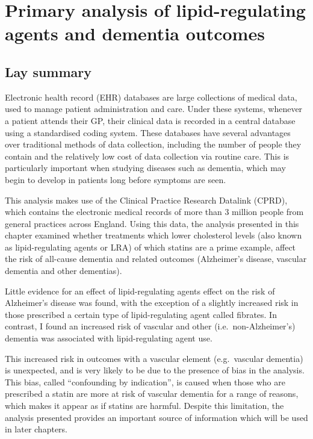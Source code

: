 \documentclass[a4paper, twoside]{templates/ociamthesis}
\begin{document}
\hypertarget{cprd-analysis-heading}{%
\chapter{Primary analysis of lipid-regulating agents and dementia outcomes}\label{cprd-analysis-heading}}

\minitoc 

\hypertarget{lay-summary-4}{%
\section{Lay summary}\label{lay-summary-4}}

Electronic health record (EHR) databases are large collections of medical data, used to manage patient administration and care. Under these systems, whenever a patient attends their GP, their clinical data is recorded in a central database using a standardised coding system. These databases have several advantages over traditional methods of data collection, including the number of people they contain and the relatively low cost of data collection via routine care. This is particularly important when studying diseases such as dementia, which may begin to develop in patients long before symptoms are seen.

This analysis makes use of the Clinical Practice Research Datalink (CPRD), which contains the electronic medical records of more than 3 million people from general practices across England. Using this data, the analysis presented in this chapter examined whether treatments which lower cholesterol levels (also known as lipid-regulating agents or LRA) of which statins are a prime example, affect the risk of all-cause dementia and related outcomes (Alzheimer's disease, vascular dementia and other dementias).

Little evidence for an effect of lipid-regulating agents effect on the risk of Alzheimer's disease was found, with the exception of a slightly increased risk in those prescribed a certain type of lipid-regulating agent called fibrates. In contrast, I found an increased risk of vascular and other (i.e.~non-Alzheimer's) dementia was associated with lipid-regulating agent use.

This increased risk in outcomes with a vascular element (e.g.~vascular dementia) is unexpected, and is very likely to be due to the presence of bias in the analysis. This bias, called ``confounding by indication'', is caused when those who are prescribed a statin are more at risk of vascular dementia for a range of reasons, which makes it appear as if statins are harmful. Despite this limitation, the analysis presented provides an important source of information which will be used in later chapters.
\end{document}
